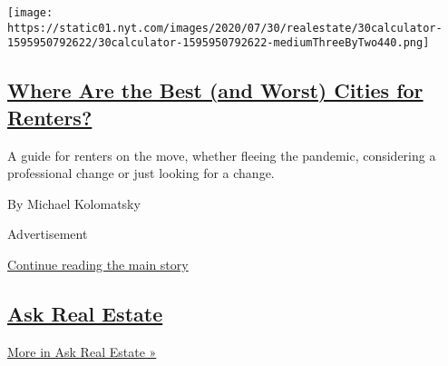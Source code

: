 \begin{enumerate}
  \texttt{[image: https://static01.nyt.com/images/2020/07/30/realestate/30calculator-1595950792622/30calculator-1595950792622-mediumThreeByTwo440.png]}

  \hypertarget{where-are-the-best-and-worst-cities-for-renters}{%
  \subsection{\texorpdfstring{\href{/2020/07/30/realestate/best-worst-cities-for-renters-coronavirus-relocation.html}{Where
  Are the Best (and Worst) Cities for
  Renters?}}{Where Are the Best (and Worst) Cities for Renters?}}\label{where-are-the-best-and-worst-cities-for-renters}}

  A guide for renters on the move, whether fleeing the pandemic,
  considering a professional change or just looking for a change.

  By Michael Kolomatsky
\end{enumerate}

Advertisement

\protect\hyperlink{after-mid1}{Continue reading the main story}

\hypertarget{ask-real-estate-1}{%
\subsection{\texorpdfstring{\href{/column/ask-real-estate}{Ask Real
Estate}}{Ask Real Estate}}\label{ask-real-estate-1}}

\href{/column/ask-real-estate}{More in Ask Real Estate »}


